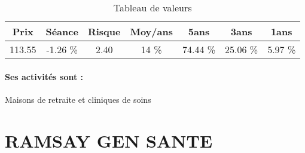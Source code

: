 \documentclass[11pt,a4paper]{report}%
\begin{document}
\begin{table}[H]
  \centering
    \begin{tabular}{|c|c|c|c|c|c|c|}
    \hline
    Prix & Séance & Risque  & Moy/ans & 5ans & 3ans & 1ans \\
    \hline
    113.55 &    -1.26 \%    & 2.40 & 14 \% & 74.44 \% & 25.06 \% & 5.97 \% \\
    \hline
    \end{tabular}%
        \label{tab:table_ORPEA}%
      \caption{Tableau de valeurs}
\end{table}%

\paragraph{Ses activités sont : } Maisons de retraite et cliniques de soins 
    
    \newpage

\section{RAMSAY GEN SANTE}
\end{document}
